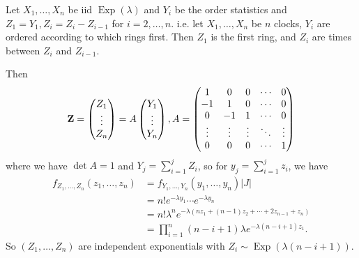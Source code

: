 \begin{example}
    Let $X_1,\ldots,X_n$ be iid $\operatorname{Exp}(\lambda)$ and $Y_i$ be the order statistics and $Z_1=Y_1,Z_i=Z_i-Z_{i-1}$ for $i=2,\ldots,n$.
    i.e. let $X_1,\dots,X_n$ be $n$ clocks, $Y_i$ are ordered according to which rings first. Then $Z_1$ is the first ring, and $ Z_i $ are times between $ Z_i $ and $ Z_{i-1} $.

    Then
    $${\bf Z}=\begin{pmatrix}
        Z_1\\
        \vdots\\
        Z_n
    \end{pmatrix}=A\begin{pmatrix}
        Y_1\\
        \vdots\\
        Y_n
    \end{pmatrix},A=\begin{pmatrix}
        1&0&0&\cdots&0\\
        -1&1&0&\cdots&0\\
        0&-1&1&\cdots&0\\
        \vdots&\vdots&\vdots&\ddots&\vdots\\
        0&0&0&\cdots&1
    \end{pmatrix}$$
    where we have $\det A=1$ and $Y_j=\sum_{i=1}^jZ_i$, so for $y_j=\sum_{i=1}^jz_i$, we have
    \begin{align*}
        f_{Z_1,\ldots,Z_n}(z_1,\ldots,z_n)&=f_{Y_1,\ldots,Y_n}(y_1,\ldots,y_n)|J|\\
        &=n!e^{-\lambda y_1}\cdots e^{-\lambda y_n}\\
        &=n!\lambda^ne^{-\lambda(nz_1+(n-1)z_2+\cdots +2z_{n-1}+z_n)}\\
        &=\prod_{i=1}^n(n-i+1)\lambda e^{-\lambda(n-i+1)z_1}.
    \end{align*}
    So $(Z_1,\ldots,Z_n)$ are independent exponentials with $Z_i\sim\operatorname{Exp}(\lambda(n-i+1))$.
\end{example}
